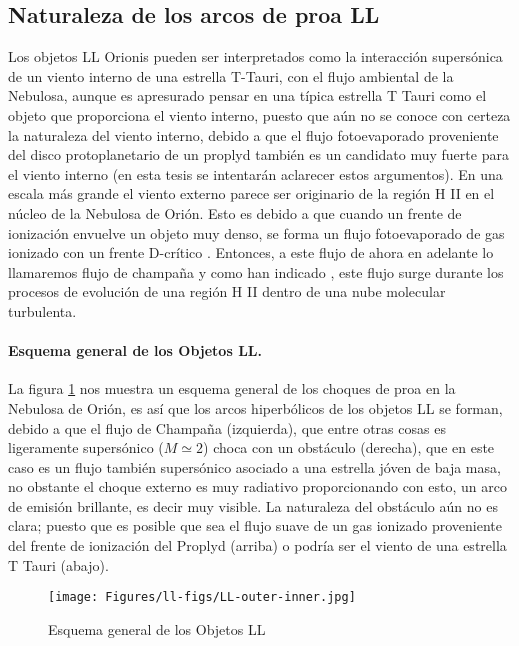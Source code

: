 \subsection{Naturaleza de los arcos de proa LL }
\label{sec:choques}

Los objetos LL Orionis pueden ser interpretados como la interacción supersónica de un viento interno de una estrella T-Tauri, con el flujo ambiental de la Nebulosa, aunque es apresurado pensar en una típica estrella T Tauri como el objeto que proporciona el viento interno, puesto que aún no se conoce con certeza la naturaleza del viento interno, debido a que el flujo fotoevaporado proveniente del disco protoplanetario de un proplyd también es un candidato muy fuerte para el viento interno (en esta tesis se intentarán aclarecer estos argumentos). En una escala más grande el viento externo parece ser originario de la  región H II en el núcleo de la Nebulosa de Orión. Esto es debido a que cuando un frente de ionización envuelve un objeto muy denso, se forma un flujo fotoevaporado de gas ionizado con un frente D-crítico \citep{Dyson:1968}. Entonces, a este flujo de ahora en adelante lo llamaremos flujo de champaña y como han indicado \citet{Mellema:2006, Arthur:2011, Ercolano:2012}, este flujo surge durante los procesos de evolución de una región H II dentro de una nube molecular turbulenta.\\

\paragraph{Esquema general de los Objetos LL.} La figura \ref{fig:esquema-arcos} nos muestra un esquema general de los choques de proa en la Nebulosa de Orión, es así que los arcos hiperbólicos de los objetos LL se forman, debido a que el flujo de Champaña (izquierda), que entre otras cosas es ligeramente supersónico (\(M\simeq2\)) choca con un obstáculo (derecha), que en este caso es un flujo también supersónico asociado a una estrella jóven de baja masa, no obstante el choque externo es muy radiativo proporcionando con esto, un arco de emisión brillante, es decir muy visible. La naturaleza del obstáculo aún no es clara; puesto que  es posible que sea el flujo suave de un gas ionizado proveniente del frente de ionización del Proplyd (arriba) o podría ser el viento de una estrella T Tauri (abajo).\\ 

\begin{figure}
  \centering
  \texttt{[image: Figures/ll-figs/LL-outer-inner.jpg]}
  \caption{Esquema general de los Objetos LL}
  \label{fig:esquema-arcos}
\end{figure}

